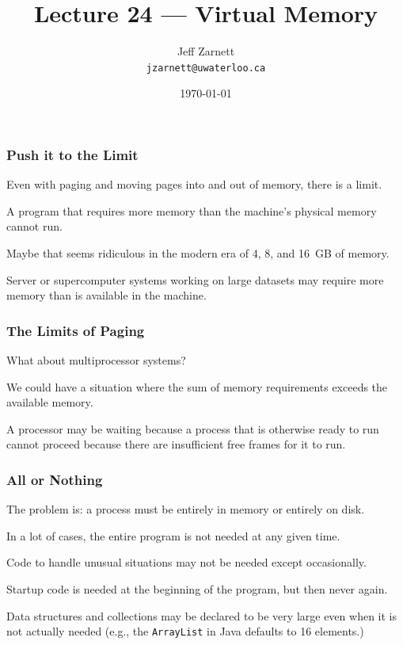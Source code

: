 

\title{Lecture 24 --- Virtual Memory}

\author{Jeff Zarnett \\ \small \texttt{jzarnett@uwaterloo.ca}}
\date{\today}




\begin{frame}
  \titlepage

 \end{frame}



\begin{frame}
\frametitle{Push it to the Limit}

Even with paging and moving pages into and out of memory, there is a limit. 

A program that requires more memory than the machine's physical memory cannot run. 

Maybe that seems ridiculous in the modern era of 4, 8, and 16~GB of memory. 

Server or supercomputer systems working on large datasets may require more memory than is available in the machine.

\end{frame}

\begin{frame}
\frametitle{The Limits of Paging}

What about multiprocessor systems?

We could have a situation where the sum of memory requirements exceeds the available memory. 

A processor may be waiting because a process that is otherwise ready to run cannot proceed because there are insufficient free frames for it to run.

\end{frame}

\begin{frame}
\frametitle{All or Nothing}

The problem is: a process must be entirely in memory or entirely on disk. 

In a lot of cases, the entire program is not needed at any given time. 

Code to handle unusual situations may not be needed except occasionally.

 Startup code is needed at the beginning of the program, but then never again. 
 
Data structures and collections may be declared to be very large even when it is not actually needed (e.g., the \texttt{ArrayList} in Java defaults to 16 elements.)

\end{frame}

